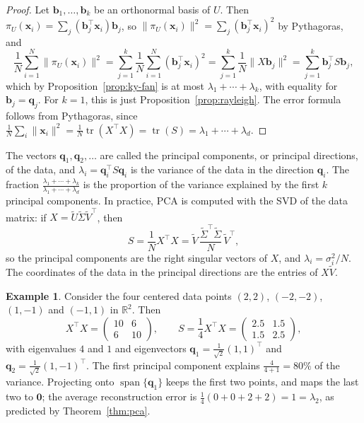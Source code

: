 \documentclass[11pt]{article}
\newcommand{\norm}[1]{\lVert #1 \rVert}
\theoremstyle{definition}
\newtheorem{example}[definition]{Example}
\theoremstyle{plain}
\theoremstyle{remark}
\DeclareMathOperator{\Span}{span}
\DeclareMathOperator{\tr}{tr}
\begin{document}
\begin{proof}
    Let $\mathbf{b}_1, \ldots, \mathbf{b}_k$ be an orthonormal basis of $U$. Then $\pi_U(\mathbf{x}_i) = \sum_j (\mathbf{b}_j^\top \mathbf{x}_i) \mathbf{b}_j$, so $\norm{\pi_U(\mathbf{x}_i)}^2 = \sum_j (\mathbf{b}_j^\top \mathbf{x}_i)^2$ by Pythagoras, and
    \[\frac{1}{N}\sum_{i=1}^N \norm{\pi_U(\mathbf{x}_i)}^2 = \sum_{j=1}^k \frac{1}{N}\sum_{i=1}^N (\mathbf{b}_j^\top \mathbf{x}_i)^2 = \sum_{j=1}^k \frac{1}{N}\norm{X\mathbf{b}_j}^2 = \sum_{j=1}^k \mathbf{b}_j^\top S \mathbf{b}_j,\]
    which by Proposition~\ref{prop:ky-fan} is at most $\lambda_1 + \cdots + \lambda_k$, with equality for $\mathbf{b}_j = \mathbf{q}_j$. For $k = 1$, this is just Proposition~\ref{prop:rayleigh}. The error formula follows from Pythagoras, since $\frac{1}{N}\sum_i \norm{\mathbf{x}_i}^2 = \frac{1}{N}\tr(X^\top X) = \tr(S) = \lambda_1 + \cdots + \lambda_d$.
\end{proof}

The vectors $\mathbf{q}_1, \mathbf{q}_2, \ldots$ are called the principal components, or principal directions, of the data, and $\lambda_i = \mathbf{q}_i^\top S \mathbf{q}_i$ is the variance of the data in the direction $\mathbf{q}_i$. The fraction $\frac{\lambda_1 + \cdots + \lambda_k}{\lambda_1 + \cdots + \lambda_d}$ is the proportion of the variance explained by the first $k$ principal components. In practice, PCA is computed with the SVD of the data matrix: if $X = \tilde{U} \tilde{\Sigma} \tilde{V}^\top$, then
\[S = \frac{1}{N} X^\top X = \tilde{V}\, \frac{\tilde{\Sigma}^\top \tilde{\Sigma}}{N}\, \tilde{V}^\top,\]
so the principal components are the right singular vectors of $X$, and $\lambda_i = \sigma_i^2 / N$. The coordinates of the data in the principal directions are the entries of $X\tilde{V}$.

\begin{example}\label{ex:pca}
    Consider the four centered data points $(2, 2)$, $(-2, -2)$, $(1, -1)$ and $(-1, 1)$ in $\mathbb{R}^2$. Then
    \[X^\top X = \begin{pmatrix} 10 & 6 \\ 6 & 10 \end{pmatrix}, \qquad S = \frac{1}{4} X^\top X = \begin{pmatrix} 2.5 & 1.5 \\ 1.5 & 2.5 \end{pmatrix},\]
    with eigenvalues $4$ and $1$ and eigenvectors $\mathbf{q}_1 = \frac{1}{\sqrt{2}}(1, 1)^\top$ and $\mathbf{q}_2 = \frac{1}{\sqrt{2}}(1, -1)^\top$. The first principal component explains $\frac{4}{4 + 1} = 80\%$ of the variance. Projecting onto $\Span\{\mathbf{q}_1\}$ keeps the first two points, and maps the last two to $\mathbf{0}$; the average reconstruction error is $\frac{1}{4}(0 + 0 + 2 + 2) = 1 = \lambda_2$, as predicted by Theorem~\ref{thm:pca}.
\end{example}
\end{document}
